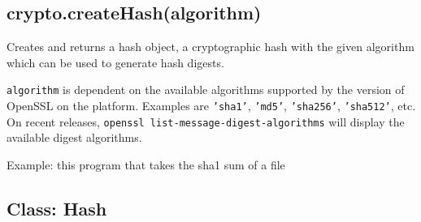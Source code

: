 \subsection{crypto.createHash(algorithm)}

Creates and returns a hash object, a cryptographic hash with the given
algorithm which can be used to generate hash digests.

\texttt{algorithm} is dependent on the available algorithms supported by
the version of OpenSSL on the platform. Examples are \texttt{'sha1'},
\texttt{'md5'}, \texttt{'sha256'}, \texttt{'sha512'}, etc. On recent
releases, \texttt{openssl list-message-digest-algorithms} will display
the available digest algorithms.

Example: this program that takes the sha1 sum of a file

\begin{Shaded}
\begin{Highlighting}[]
 \NormalTok{[}\NormalTok{];}
 \NormalTok{);}
 \NormalTok{);}

 \NormalTok{(}\NormalTok{);}

 
\NormalTok{(}\NormalTok{, }
\NormalTok{\});}

\NormalTok{(}\NormalTok{, }\NormalTok{() \{}
   \NormalTok{(}\NormalTok{);}
   
\NormalTok{\});}
\end{Highlighting}
\end{Shaded}

\subsection{Class: Hash}


